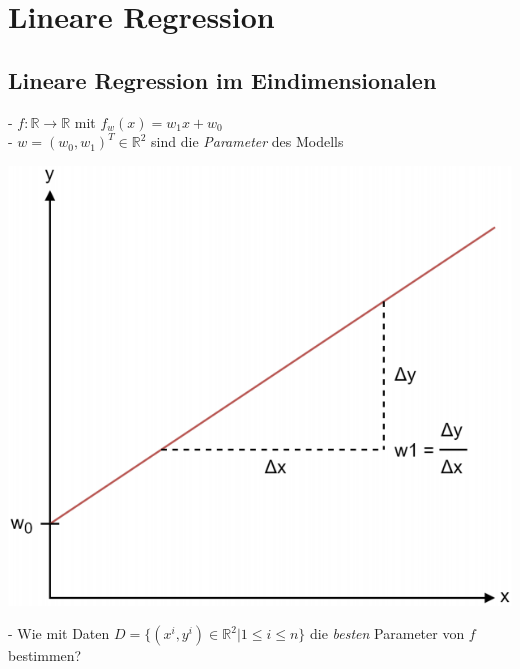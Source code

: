 \documentclass{report}
\begin{document}
\chapter{Lineare Regression}
\section{Lineare Regression im Eindimensionalen}
- $f : \mathbb{R} \rightarrow \mathbb{R}$ mit $f_w(x) = w_1x + w_0$\\
- $w = (w_0, w_1)^T \in \mathbb{R}^2$ sind die \textit{Parameter} des Modells
\begin{center}
  \includegraphics[scale=0.275]{ml02_1}
\end{center}
- Wie mit Daten $D = \{(x^i, y^i) \in \mathbb{R}^2 | 1 \leq i \leq n\}$ die \textit{besten} Parameter von $f$ bestimmen?\\
\end{document}
